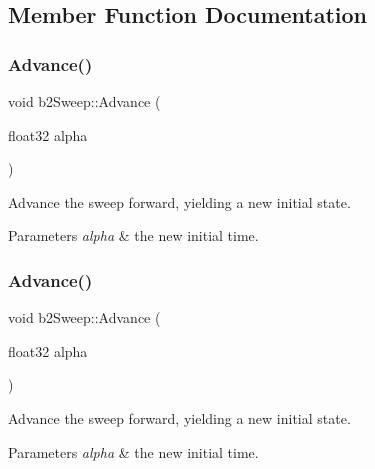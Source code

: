 \subsection{Member Function Documentation}
\mbox{\label{structb2Sweep_a35eb9b976ca87c9b8d758bec070c6c06}} 
\subsubsection{\texorpdfstring{Advance()}{Advance()}\hspace{0.1cm}{\footnotesize\ttfamily [1/2]}}
{\footnotesize\ttfamily void b2\+Sweep\+::\+Advance (\begin{DoxyParamCaption}\item[{float32}]{alpha }\end{DoxyParamCaption})\hspace{0.3cm}{\ttfamily [inline]}}

Advance the sweep forward, yielding a new initial state. 
\begin{DoxyParams}{Parameters}
{\em alpha} & the new initial time. \\
\hline
\end{DoxyParams}
\mbox{\label{structb2Sweep_a35eb9b976ca87c9b8d758bec070c6c06}} 
\subsubsection{\texorpdfstring{Advance()}{Advance()}\hspace{0.1cm}{\footnotesize\ttfamily [2/2]}}
{\footnotesize\ttfamily void b2\+Sweep\+::\+Advance (\begin{DoxyParamCaption}\item[{float32}]{alpha }\end{DoxyParamCaption})}

Advance the sweep forward, yielding a new initial state. 
\begin{DoxyParams}{Parameters}
{\em alpha} & the new initial time. \\
\hline
\end{DoxyParams}
\mbox{\label{structb2Sweep_a22ae50509de51876aefc48cd76248c61}} 
